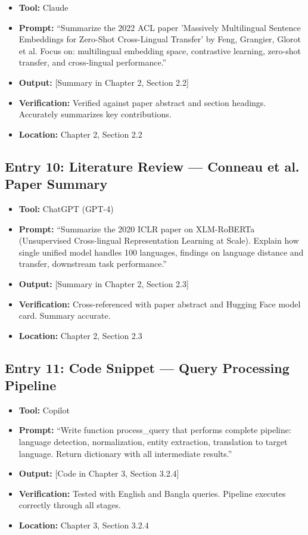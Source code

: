 \documentclass[12pt,a4paper]{report}
\begin{document}
\begin{itemize}
    \item \textbf{Tool:} Claude
    \item \textbf{Prompt:} ``Summarize the 2022 ACL paper 'Massively Multilingual Sentence Embeddings for Zero-Shot Cross-Lingual Transfer' by Feng, Grangier, Glorot et al. Focus on: multilingual embedding space, contrastive learning, zero-shot transfer, and cross-lingual performance.''
    \item \textbf{Output:} [Summary in Chapter 2, Section 2.2]
    \item \textbf{Verification:} Verified against paper abstract and section headings. Accurately summarizes key contributions.
    \item \textbf{Location:} Chapter 2, Section 2.2
\end{itemize}

\subsection{Entry 10: Literature Review --- Conneau et al. Paper Summary}

\begin{itemize}
    \item \textbf{Tool:} ChatGPT (GPT-4)
    \item \textbf{Prompt:} ``Summarize the 2020 ICLR paper on XLM-RoBERTa (Unsupervised Cross-lingual Representation Learning at Scale). Explain how single unified model handles 100 languages, findings on language distance and transfer, downstream task performance.''
    \item \textbf{Output:} [Summary in Chapter 2, Section 2.3]
    \item \textbf{Verification:} Cross-referenced with paper abstract and Hugging Face model card. Summary accurate.
    \item \textbf{Location:} Chapter 2, Section 2.3
\end{itemize}

\subsection{Entry 11: Code Snippet --- Query Processing Pipeline}

\begin{itemize}
    \item \textbf{Tool:} Copilot
    \item \textbf{Prompt:} ``Write function process\_query that performs complete pipeline: language detection, normalization, entity extraction, translation to target language. Return dictionary with all intermediate results.''
    \item \textbf{Output:} [Code in Chapter 3, Section 3.2.4]
    \item \textbf{Verification:} Tested with English and Bangla queries. Pipeline executes correctly through all stages.
    \item \textbf{Location:} Chapter 3, Section 3.2.4
\end{itemize}
\end{document}
